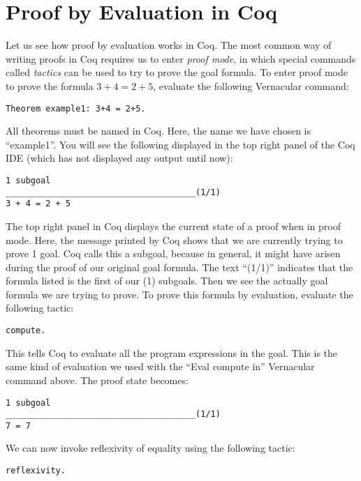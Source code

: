\documentclass{book}[12pt]
\begin{document}
\section{Proof by Evaluation in Coq}

Let us see how proof by evaluation works in Coq.  The most common way
of writing proofs in Coq requires us to enter \emph{proof mode}, in
which special commands called \emph{tactics} can be used to try to
prove the goal formula.  To enter proof mode to prove the formula $3+4
= 2+5$, evaluate the following Vernacular command:

\begin{verbatim}
Theorem example1: 3+4 = 2+5.
\end{verbatim}

\noindent All theorems must be named in Coq.  Here, the name we have
chosen is ``example1''.  You will see the following displayed in the
top right panel of the Coq IDE (which has not displayed any output
until now):

\begin{verbatim}
1 subgoal
______________________________________(1/1)
3 + 4 = 2 + 5
\end{verbatim}

\noindent The top right panel in Coq displays the current state of a
proof when in proof mode.  Here, the message printed by Coq shows that
we are currently trying to prove 1 goal.  Coq calls this a subgoal,
because in general, it might have arisen during the proof of our
original goal formula.  The text ``(1/1)'' indicates that the formula
listed is the first of our (1) subgoals.  Then we see the actually
goal formula we are trying to prove.  To prove this formula by evaluation,
evaluate the following tactic:

\begin{verbatim}
compute.
\end{verbatim}

\noindent This tells Coq to evaluate all the program expressions
in the goal.  This is the same kind of evaluation we used with the
``Eval compute in'' Vernacular command above.  The proof state 
becomes:

\begin{verbatim}
1 subgoal
______________________________________(1/1)
7 = 7
\end{verbatim}


\noindent We can now invoke reflexivity of equality using the following
tactic:

\begin{verbatim}
reflexivity.
\end{verbatim}
\end{document}
